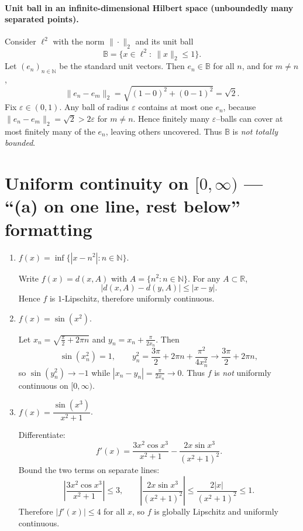 \documentclass[12pt,a4paper]{article}
\begin{document}
\bigskip

\paragraph{Unit ball in an infinite-dimensional Hilbert space (unboundedly many separated points).}
Consider $\ell^2$ with the norm $\|\cdot\|_2$ and its unit ball
\[
\mathbb{B}=\{x\in\ell^2:\ \|x\|_2\le 1\}.
\]
Let $(e_n)_{n\in\mathbb{N}}$ be the standard unit vectors. Then $e_n\in\mathbb{B}$ for all $n$, and for $m\neq n$,
\[
\|e_n-e_m\|_2=\sqrt{(1-0)^2+(0-1)^2}=\sqrt{2}.
\]
Fix $\varepsilon\in(0,1)$. Any ball of radius $\varepsilon$ contains at most one $e_n$, because
$\|e_n-e_m\|_2=\sqrt{2}>2\varepsilon$ for $m\neq n$. Hence finitely many $\varepsilon$–balls can cover at most
finitely many of the $e_n$, leaving others uncovered. Thus $\mathbb{B}$ is \emph{not totally bounded}.

\section*{Uniform continuity on $[0,\infty)$ — “(a) on one line, rest below” formatting}

\begin{enumerate}[label=(\alph*),leftmargin=*]
	
	\item $f(x)=\inf\{|x-n^2|:n\in\mathbb{N}\}$.\\  \par\medskip
	Write $f(x)=d(x,A)$ with $A=\{n^2:n\in\mathbb{N}\}$. For any $A\subset\mathbb{R}$,
	\[
	|d(x,A)-d(y,A)|\le |x-y|.
	\]
	Hence $f$ is $1$-Lipschitz, therefore uniformly continuous.
	
	\item $f(x)=\sin(x^2)$.\\  \par\medskip
	Let $x_n=\sqrt{\frac{\pi}{2}+2\pi n}$ and $y_n=x_n+\frac{\pi}{2x_n}$. Then
	\[
	\sin(x_n^2)=1,\qquad
	y_n^2=\frac{3\pi}{2}+2\pi n+\frac{\pi^2}{4x_n^2}\to \frac{3\pi}{2}+2\pi n,
	\]
	so $\sin(y_n^2)\to -1$ while $|x_n-y_n|=\frac{\pi}{2x_n}\to0$. Thus $f$ is \emph{not} uniformly
	continuous on $[0,\infty)$.
	
	\item $f(x)=\dfrac{\sin(x^3)}{x^2+1}$.\\  \par\medskip
	Differentiate:
	\[
	f'(x)=\frac{3x^2\cos x^3}{x^2+1}-\frac{2x\sin x^3}{(x^2+1)^2}.
	\]
	Bound the two terms on separate lines:
	\[
	\left|\frac{3x^2\cos x^3}{x^2+1}\right|\le 3,
	\qquad
	\left|\frac{2x\sin x^3}{(x^2+1)^2}\right|\le \frac{2|x|}{(x^2+1)^2}\le 1.
	\]
	Therefore $|f'(x)|\le 4$ for all $x$, so $f$ is globally Lipschitz and uniformly continuous.
	
\end{enumerate}
\end{document}
